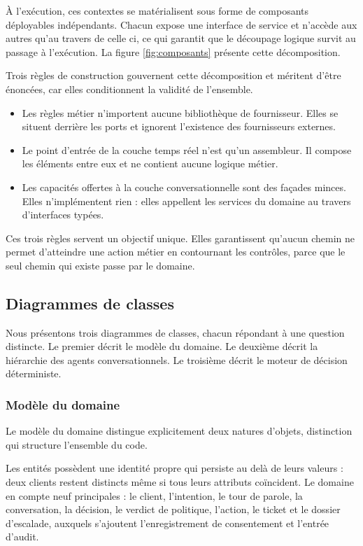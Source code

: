 À l'exécution, ces contextes se matérialisent sous forme de composants déployables indépendants. Chacun expose une interface de service et n'accède aux autres qu'au travers de celle ci, ce qui garantit que le découpage logique survit au passage à l'exécution. La figure \ref{fig:composants} présente cette décomposition.


Trois règles de construction gouvernent cette décomposition et méritent d'être énoncées, car elles conditionnent la validité de l'ensemble.

\begin{itemize}
  \item Les règles métier n'importent aucune bibliothèque de fournisseur. Elles se situent derrière les ports et ignorent l'existence des fournisseurs externes.
  \item Le point d'entrée de la couche temps réel n'est qu'un assembleur. Il compose les éléments entre eux et ne contient aucune logique métier.
  \item Les capacités offertes à la couche conversationnelle sont des façades minces. Elles n'implémentent rien : elles appellent les services du domaine au travers d'interfaces typées.
\end{itemize}

Ces trois règles servent un objectif unique. Elles garantissent qu'aucun chemin ne permet d'atteindre une action métier en contournant les contrôles, parce que le seul chemin qui existe passe par le domaine.

\subsection{Diagrammes de classes}

Nous présentons trois diagrammes de classes, chacun répondant à une question distincte. Le premier décrit le modèle du domaine. Le deuxième décrit la hiérarchie des agents conversationnels. Le troisième décrit le moteur de décision déterministe.

\subsubsection{Modèle du domaine}

Le modèle du domaine distingue explicitement deux natures d'objets, distinction qui structure l'ensemble du code.

Les entités possèdent une identité propre qui persiste au delà de leurs valeurs : deux clients restent distincts même si tous leurs attributs coïncident. Le domaine en compte neuf principales : le client, l'intention, le tour de parole, la conversation, la décision, le verdict de politique, l'action, le ticket et le dossier d'escalade, auxquels s'ajoutent l'enregistrement de consentement et l'entrée d'audit.

